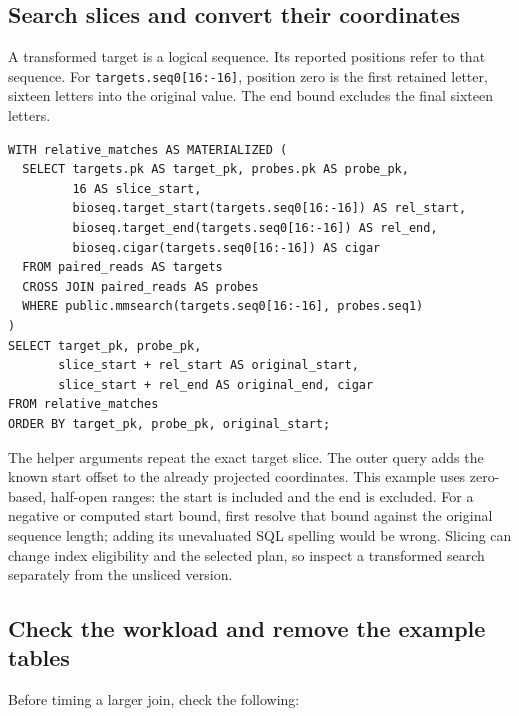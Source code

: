 \subsection{Search slices and convert their coordinates}

A transformed target is a logical sequence. Its reported positions refer
to that sequence. For \texttt{targets.seq0[16:-16]}, position zero is the
first retained letter, sixteen letters into the original value. The end
bound excludes the final sixteen letters.

\par\noindent\begin{minipage}{\linewidth}
\begin{lstlisting}[style=bioseq-appendix-sql]
WITH relative_matches AS MATERIALIZED (
  SELECT targets.pk AS target_pk, probes.pk AS probe_pk,
         16 AS slice_start,
         bioseq.target_start(targets.seq0[16:-16]) AS rel_start,
         bioseq.target_end(targets.seq0[16:-16]) AS rel_end,
         bioseq.cigar(targets.seq0[16:-16]) AS cigar
  FROM paired_reads AS targets
  CROSS JOIN paired_reads AS probes
  WHERE public.mmsearch(targets.seq0[16:-16], probes.seq1)
)
SELECT target_pk, probe_pk,
       slice_start + rel_start AS original_start,
       slice_start + rel_end AS original_end, cigar
FROM relative_matches
ORDER BY target_pk, probe_pk, original_start;
\end{lstlisting}
\end{minipage}

The helper arguments repeat the exact target slice. The outer query adds
the known start offset to the already projected coordinates. This example
uses zero-based, half-open ranges: the start is included and the end is
excluded. For a negative or computed start bound, first resolve that bound
against the original sequence length; adding its unevaluated SQL spelling
would be wrong. Slicing can change index eligibility and the selected plan,
so inspect a transformed search separately from the unsliced version.

\subsection{Check the workload and remove the example tables}

Before timing a larger join, check the following:

